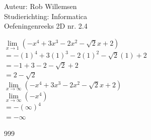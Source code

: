 \documentclass[a4paper]{article}
\begin{document}
\noindent \large Auteur: Rob Willemsen \\
\noindent \large Studierichting: Informatica\\
\noindent \large Oefeningenreeks 2D nr. 2.4\\

\medskip

\normalsize

$\lim\limits_{x \rightarrow 1} (-x^4 + 3x^3 - 2x^2 - \sqrt{2}x + 2)$ \\ 

$= -(1)^4 + 3(1)^3 - 2(1)^2 - \sqrt{2}(1) + 2$ \\

$= -1 + 3 - 2 - \sqrt{2} + 2$ \\

$= 2 - \sqrt{2}$ \\


$\lim\limits_{x \rightarrow \infty} (-x^4 + 3x^3 - 2x^2 - \sqrt{2}x + 2)$ \\ 

$\lim\limits_{x \rightarrow \infty} (-x^4)$ \\

$= -(\infty)^4$ \\

$= -\infty$


\begin{thebibliography}{999}
\end{thebibliography}
\end{document}
